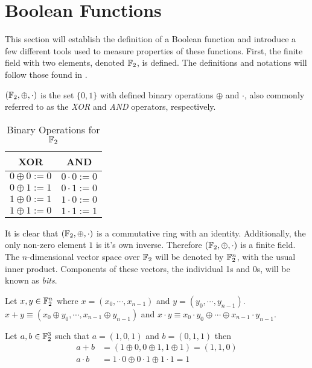 \section{Boolean Functions}
\par This section will establish the definition of a Boolean function and introduce
a few different tools used to measure properties of these functions. First, the
finite field with two elements, denoted $\mathbb{F}_2$, is defined. The definitions and
notations will follow those found in \cite{bk:cs09}.

\begin{definition}
\label{def:GF(2)}
	$(\mathbb{F}_2,\oplus,\cdot)$ is the set $\{0,1\}$ with defined binary operations $\oplus$ and $\cdot$, also
	commonly referred to as the {\em XOR} and {\em AND} operators, respectively.
	\begin{table}[h!]\label{table:GF(2)}
		\centering
		\begin{tabular}{|c|c|}
			\hline
			XOR&AND\\
			\hline
			$0\oplus0:=0$&$0\cdot0:=0$\\
			$0\oplus1:=1$&$0\cdot1:=0$\\
			$1\oplus0:=1$&$1\cdot0:=0$\\
			$1\oplus1:=0$&$1\cdot1:=1$\\
			\hline
		\end{tabular}
		\caption{Binary Operations for $\mathbb{F}_2$}
	\end{table}
\end{definition}

\par It is clear that $(\mathbb{F}_2,\oplus,\cdot)$ is a commutative ring with an identity.
Additionally, the only non-zero element $1$ is it's own inverse. Therefore $(\mathbb{F}_2,\oplus,\cdot)$
is a finite field. The $n$-dimensional vector space over $\mathbb{F}_2$ will be denoted by $\mathbb{F}_2^n$,
with the usual inner product. Components of these vectors, the individual 1s and 0s, will
be known as {\em bits}.

\begin{definition}
\label{def:GF(2)^n-bos}
	Let $x,y\in\mathbb{F}_2^n$ where $x=(x_0,\cdots,x_{n-1})$ and $y=(y_0,\cdots,y_{n-1})$.
	$x+y\equiv(x_0\oplus y_0,\cdots,x_{n-1}\oplus y_{n-1})$ and 
	$x\cdot y\equiv x_0\cdot y_0 \oplus \cdots \oplus x_{n-1}\cdot y_{n-1}$.
\end{definition}

\begin{example}
	Let $a,b\in\mathbb{F}_2^3$ such that $a=(1,0,1)$ and $b=(0,1,1)$ then
	\begin{align*}
		a+b      &=(1\oplus0,0\oplus1,1\oplus1)=(1,1,0) \\
		a\cdot b &=1\cdot0\oplus0\cdot1\oplus1\cdot1=1
	\end{align*}
\end{example}

